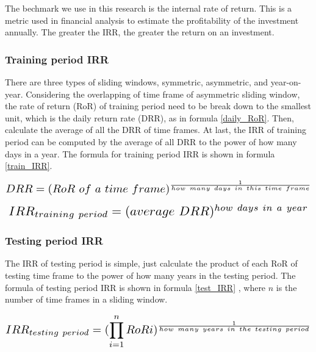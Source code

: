 \documentclass[../Proposed Method.tex]{subfiles}
\begin{document}
The bechmark we use in this research is the internal rate of return. This is a metric used in financial analysis to estimate the profitability of the investment annually. The greater the IRR, the greater the return on an investment.

\subsubsection{Training period IRR}

There are three types of sliding windows, symmetric, asymmetric, and year-on-year. Considering the overlapping of time frame of asymmetric sliding window, the rate of return (RoR) of training period need to be break down to the smallest unit, which is the daily return rate (DRR), as in formula \ref{daily_RoR}. Then, calculate the average of all the DRR of time frames. At last, the IRR of training period can be computed by the average of all DRR to the power of how many days in a year. The formula for training period IRR is shown in formula \ref{train_IRR}.

\begin{equation}
    \label{daily_RoR}
    \scalebox{1.5}
    {$DRR = (RoR\ of\ a\ time\ frame)^{\frac{1}{how\ many\ days\ in\ this\ time\ frame}}$}
\end{equation}

\begin{equation}
    \label{train_IRR}
    \scalebox{1.5}
    {$IRR_{training\ period}=(average\ DRR)^{how\ days\ in\ a\ year}$}
\end{equation}

\subsubsection{Testing period IRR}

The IRR of testing period is simple, just calculate the product of each RoR of testing time frame to the power of how many years in the testing period. The formula of testing period IRR is shown in formula \ref{test_IRR} , where $n$ is the number of time frames in a sliding window.

\begin{equation}
    \label{test_IRR}
    \scalebox{1.5}
    {$IRR_{testing\ period}=(\displaystyle \prod_{i=1}^{n} RoR{i})^{\frac{1}{how\ many\ years\ in\ the\ testing\ period}}$}
\end{equation}
\end{document}
